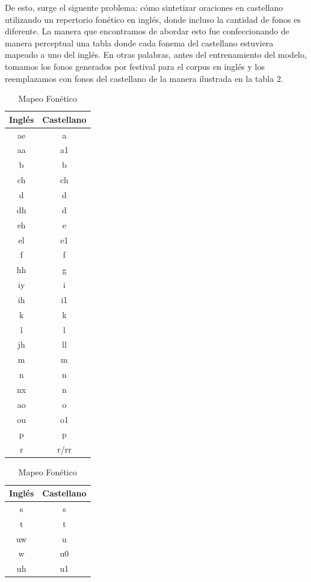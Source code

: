 De esto, surge el siguente problema: cómo sintetizar oraciones en castellano utilizando un repertorio fonético en inglés, donde incluso la cantidad de fonos es diferente. La manera que encontramos de abordar esto fue confeccionando de manera perceptual una tabla donde cada fonema del castellano estuviera mapeado a uno del inglés. En otras palabras, antes del entrenamiento del modelo, tomamos los fonos generados por festival para el corpus en inglés y los reemplazamos con fonos del castellano de la manera ilustrada en la tabla 2.
\begin{table}
\centering
\caption{Mapeo Fonético}
\begin{minipage}[t]{0.3\textwidth}
\begin{tabular}[t]{c|c}
\toprule
Inglés & Castellano \\
\midrule
ae & a\\  
aa & a1\\  
b & b\\  
ch & ch\\  
d & d\\  
dh & d\\  
eh & e\\  
el & e1\\  
f & f\\  
hh & g\\  
iy & i\\  
ih & i1\\  
k & k\\  
l & l\\  
jh & ll\\  
m & m\\  
n & n\\  
nx & n\\  
ao & o\\  
ou & o1\\  
p & p\\  
r & r/rr\\  
\bottomrule
\end{tabular}
\end{minipage}
\begin{minipage}[t]{0.3\textwidth}
\begin{tabular}[t]{c|c}
\toprule
Inglés & Castellano \\ 
\midrule
s & s\\  
t & t\\  
uw & u\\  
w & u0\\  
uh & u1\\  

\end{tabular}
\end{minipage}
\end{table}

